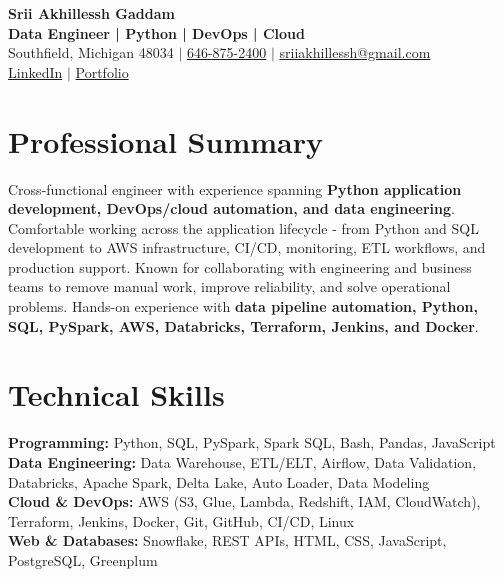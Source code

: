 \documentclass[letterpaper,10pt]{article}
\begin{document}
\fontsize{9.35pt}{10.45pt}\selectfont

\begin{center}
    {\LARGE \textbf{Srii Akhillessh Gaddam}} \\[-1pt]
    \textbf{Data Engineer | Python | DevOps | Cloud} \\[2pt]
    Southfield, Michigan 48034 $|$
    \href{tel:6468752400}{646-875-2400} $|$
    \href{mailto:sriiakhillessh@gmail.com}{sriiakhillessh@gmail.com} \\[1pt]
    \href{https://www.linkedin.com/in/srii-akhiilessh-gaddam-b48668191/}{LinkedIn} $|$
    \href{https://sriiakhillesshg.github.io/portfolio/}{Portfolio}
\end{center}
\vspace{-8pt}

\section{Professional Summary}
\small{Cross-functional engineer with experience spanning \textbf{Python application development, DevOps/cloud automation, and data engineering}. Comfortable working across the application lifecycle - from Python and SQL development to AWS infrastructure, CI/CD, monitoring, ETL workflows, and production support. Known for collaborating with engineering and business teams to remove manual work, improve reliability, and solve operational problems. Hands-on experience with \textbf{data pipeline automation, Python, SQL, PySpark, AWS, Databricks, Terraform, Jenkins, and Docker}.}

\section{Technical Skills}
\small{
\textbf{Programming:} Python, SQL, PySpark, Spark SQL, Bash, Pandas, JavaScript \\
\textbf{Data Engineering:} Data Warehouse, ETL/ELT, Airflow, Data Validation, Databricks, Apache Spark, Delta Lake, Auto Loader, Data Modeling \\
\textbf{Cloud \& DevOps:} AWS (S3, Glue, Lambda, Redshift, IAM, CloudWatch), Terraform, Jenkins, Docker, Git, GitHub, CI/CD, Linux \\
\textbf{Web \& Databases:} Snowflake, REST APIs, HTML, CSS, JavaScript, PostgreSQL, Greenplum
}
\end{document}
